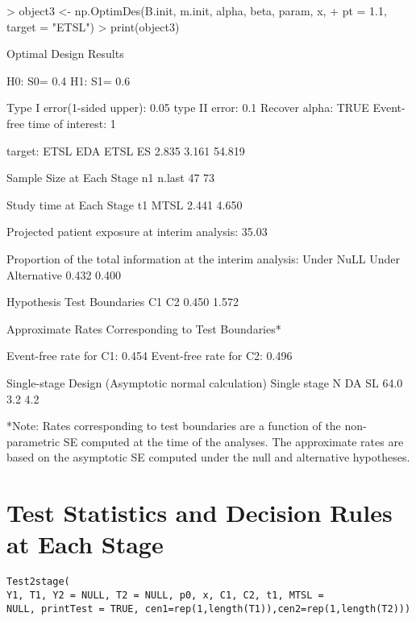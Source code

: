 \documentclass[12pt]{article}
\begin{document}
\begin{Schunk}
\begin{Sinput}
> object3 <- np.OptimDes(B.init, m.init, alpha, beta, param, x,
+     pt = 1.1, target = "ETSL")
> print(object3)
\end{Sinput}
\begin{Soutput}
             Optimal Design Results

    H0: S0= 0.4 H1: S1= 0.6

    Type I error(1-sided upper): 0.05 type II error: 0.1
    Recover alpha: TRUE
    Event-free time of interest: 1

                  target: ETSL
          EDA          ETSL            ES
        2.835         3.161        54.819

          Sample Size at Each Stage
              n1           n.last
              47               73

          Study time at Each Stage
               t1              MTSL
            2.441             4.650

    Projected patient exposure at interim analysis:  35.03

    Proportion of the total information at the interim analysis:
           Under NuLL     Under Alternative
                0.432                 0.400


          Hypothesis Test Boundaries
               C1                C2
            0.450             1.572


    Approximate Rates Corresponding to Test Boundaries*

          Event-free rate for C1:  0.454
          Event-free rate for C2:  0.496


    Single-stage Design (Asymptotic normal calculation)
      Single stage N                   DA                   SL
                64.0                  3.2                  4.2


 *Note:  Rates corresponding to test boundaries are a function
 of the non-parametric SE computed at the time of the analyses.
 The approximate rates are based on the asymptotic SE computed
 under the null and alternative hypotheses.
\end{Soutput}
\end{Schunk}

\section{Test Statistics and Decision Rules at Each Stage}
\label{test}
\begin{center}
\begin{verbatim}
Test2stage(
Y1, T1, Y2 = NULL, T2 = NULL, p0, x, C1, C2, t1, MTSL =
NULL, printTest = TRUE, cen1=rep(1,length(T1)),cen2=rep(1,length(T2)))
\end{verbatim}
\end{center}
\end{document}
